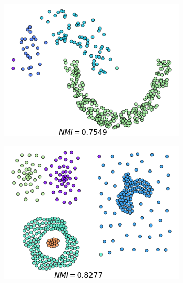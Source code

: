 \documentclass{llncs}
\begin{document}
\begin{figure}[ht]
\begin{subfigure}[t]{0.23\textwidth}
\end{subfigure}
\begin{subfigure}[t]{0.23\textwidth}
\centering
\includegraphics[width=1\textwidth]{image/jain_dbscan.png}
\end{subfigure}
\quad
\quad
\quad
\quad
\begin{subfigure}[t]{0.23\textwidth}
\centering
\includegraphics[width=1\textwidth]{image/Compound_MDPC.png}
\end{subfigure}
\begin{subfigure}[t]{0.23\textwidth}
\centering

\end{subfigure}
\end{figure}
\end{document}
